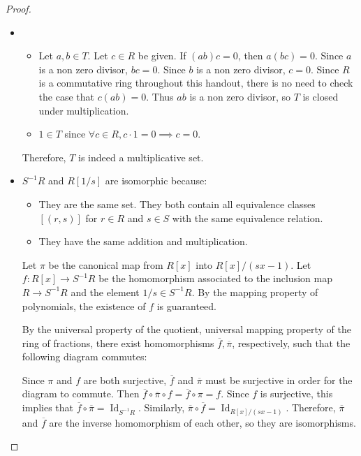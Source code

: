 \documentclass[12pt, psamsfonts]{amsart}
\theoremstyle{definition}
\theoremstyle{remark}
\DeclareMathOperator{\Id}{Id}
\numberwithin{equation}{section}
\begin{document}
\begin{proof}
  $ $
  \begin{itemize}
    \item
      \begin{itemize}
        \item
          Let $a, b \in T$.
          Let $c \in R$ be given.
          If $(ab)c = 0$, then $a(bc) = 0$.
          Since $a$ is a non zero divisor, $bc = 0$.
          Since $b$ is a non zero divisor, $c = 0$.
          Since $R$ is a commutative ring throughout this handout, there is no need to check the case that $c(ab) = 0$.
          Thus $ab$ is a non zero divisor, so $T$ is closed under multiplication.
        \item
          $1 \in T$ since $\forall c \in R, c \cdot 1 = 0 \implies c = 0$.
      \end{itemize}

      Therefore, $T$ is indeed a multiplicative set.
    \item
      $S^{-1}R$ and $R[1/s]$ are isomorphic because:
      \begin{itemize}
        \item
          They are the same set.
          They both contain all equivalence classes $[(r, s)]$ for $r \in R$ and $s \in S$ with the same equivalence relation.
        \item
          They have the same addition and multiplication.
      \end{itemize}

      Let $\pi$ be the canonical map from $R[x]$ into $R[x] / (sx - 1)$.
      Let $f: R[x] \rightarrow S^{-1}R$ be the homomorphism associated to the inclusion map $R \rightarrow S^{-1}R$ and the element $1 / s \in S^{-1}R$.
      By the mapping property of polynomials, the existence of $f$ is guaranteed.

      By the universal property of the quotient, universal mapping property of the ring of fractions, there exist homomorphisms $\overline{f}, \overline{\pi}$, respectively, such that the following diagram commutes:
      \begin{center}
      \end{center}
      Since $\pi$ and $f$ are both surjective, $\overline{f}$ and $\overline{\pi}$ must be surjective in order for the diagram to commute.
      Then $\overline{f} \circ \overline{\pi} \circ f = \overline{f} \circ \pi = f$.
      Since $f$ is surjective, this implies that $\overline{f} \circ \overline{\pi} = \Id_{S^{-1}R}$.
      Similarly, $\overline{\pi} \circ \overline{f} = \Id_{R[x]/(sx - 1)}$.
      Therefore, $\overline{\pi}$ and $\overline{f}$ are the inverse homomorphism of each other, so they are isomorphisms.
  \end{itemize}
\end{proof}
\end{document}
